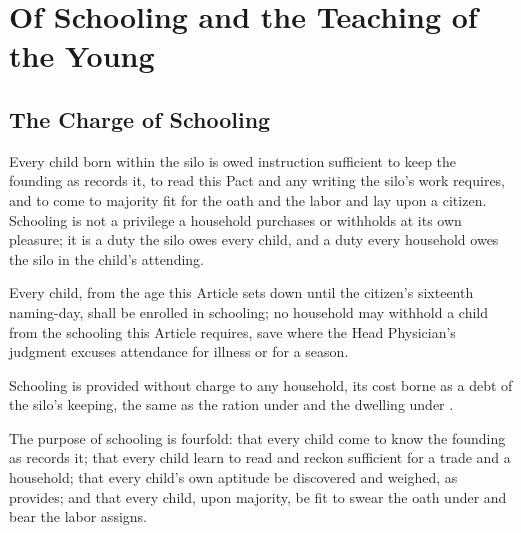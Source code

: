 \chapter{Of Schooling and the Teaching of the Young}
\label{art:schooling}


\section{The Charge of Schooling}
\label{sec:schooling:charge-of-schooling}

Every child born within the silo is owed instruction sufficient to keep the founding as  records it, to read this Pact and any writing the silo's work requires, and to come to majority fit for the oath and the labor  and  lay upon a citizen. Schooling is not a privilege a household purchases or withholds at its own pleasure; it is a duty the silo owes every child, and a duty every household owes the silo in the child's attending.

\begin{clauses}
\item Every child, from the age this Article sets down until the citizen's sixteenth naming-day, shall be enrolled in schooling; no household may withhold a child from the schooling this Article requires, save where the Head Physician's judgment excuses attendance for illness or for a season.
\item Schooling is provided without charge to any household, its cost borne as a debt of the silo's keeping, the same as the ration under  and the dwelling under .
\item The purpose of schooling is fourfold: that every child come to know the founding as  records it; that every child learn to read and reckon sufficient for a trade and a household; that every child's own aptitude be discovered and weighed, as  provides; and that every child, upon majority, be fit to swear the oath under  and bear the labor  assigns.
\end{clauses}

